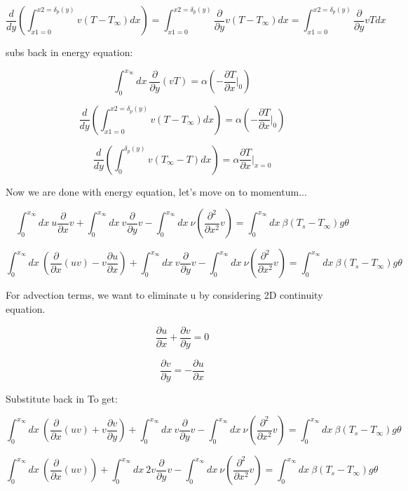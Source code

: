 \documentclass[11pt]{article}
\begin{document}
$$ \frac{d}{dy} \left( \int_{x1=0}^{x2=\delta_p(y)} v(T-T_\infty) dx \right)=   \int_{x1=0}^{x2=\delta_p(y)} \frac{\partial}{\partial y} v(T-T_\infty) dx = \int_{x1=0}^{x2=\delta_p(y)} \frac{\partial}{\partial y} vT dx$$

subs back in energy equation:

$$  \int_0^{x_\infty}  dx\  \frac{\partial}{\partial y}(vT)  = \alpha ( - \frac{\partial T }{\partial x}|_0 )   $$ 

$$   \frac{d}{dy} \left( \int_{x1=0}^{x2=\delta_p(y)} v(T-T_\infty) dx \right) = \alpha ( - \frac{\partial T }{\partial x}|_0 )   $$ 

$$   \frac{d}{dy} \left( \int_{0}^{\delta_p(y)} v(T_\infty - T) dx \right) = \alpha \frac{\partial T }{\partial x}|_{x=0}    $$ 

Now we are done with energy equation, let's move on to momentum...

$$ \int_0^{x_\infty}  dx\ u \frac{\partial}{\partial x} v  + \int_0^{x_\infty}  dx \  v \frac{\partial}{\partial y} v  - \int_0^{x_\infty}  dx \ \nu ( \frac{\partial^2}{\partial x^2} v ) =  \int_0^{x_\infty}  dx \ \beta(T_s-T_\infty) g \theta $$

$$ \int_0^{x_\infty}  dx\ (\frac{\partial }{\partial x} (uv) - v \frac{\partial u}{\partial x})  + \int_0^{x_\infty}  dx \  v \frac{\partial}{\partial y} v  - \int_0^{x_\infty}  dx \ \nu ( \frac{\partial^2}{\partial x^2} v ) =  \int_0^{x_\infty}  dx \ \beta(T_s-T_\infty) g \theta $$


For advection terms, we want to eliminate u by considering 2D continuity equation.

$$\frac{\partial u}{\partial x} + \frac{\partial v}{\partial y}= 0$$

$$ \frac{\partial v}{\partial y}= -\frac{\partial u}{\partial x}$$

Substitute back in To get:


$$ \int_0^{x_\infty}  dx\ (\frac{\partial }{\partial x} (uv) + v \frac{\partial v}{\partial y})  + \int_0^{x_\infty}  dx \  v \frac{\partial}{\partial y} v  - \int_0^{x_\infty}  dx \ \nu ( \frac{\partial^2}{\partial x^2} v ) =  \int_0^{x_\infty}  dx \ \beta(T_s-T_\infty) g \theta $$



$$ \int_0^{x_\infty}  dx\ (\frac{\partial }{\partial x} (uv) )  + \int_0^{x_\infty}  dx \ 2 v \frac{\partial}{\partial y} v  - \int_0^{x_\infty}  dx \ \nu ( \frac{\partial^2}{\partial x^2} v ) =  \int_0^{x_\infty}  dx \ \beta(T_s-T_\infty) g \theta $$
\end{document}
